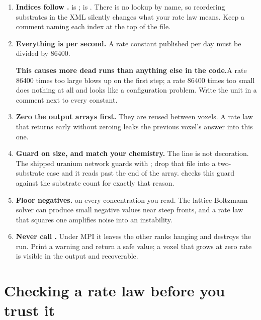 \begin{enumerate}[leftmargin=1.4em]
\item \textbf{Indices follow .}  is
;  is . There is no lookup by name, so
reordering substrates in the XML silently changes what your rate law means.
Keep a comment naming each index at the top of the file.

\item \textbf{Everything is per second.} A rate constant published per day must
be divided by 86400.

\begin{cbwarn}
\textbf{\color{cbRed}This causes more dead runs than anything else in the
code.}\quad A rate 86400 times too large blows up on the first step; a rate
86400 times too small does nothing at all and looks like a configuration
problem. Write the unit in a comment next to every constant.
\end{cbwarn}

\item \textbf{Zero the output arrays first.} They are reused between voxels. A
rate law that returns early without zeroing leaks the previous voxel's answer
into this one.

\item \textbf{Guard on size, and match your chemistry.} The
 line is not decoration. The shipped uranium network
guards with ; drop that file into a two-substrate case and
it reads past the end of the array.  checks this
guard against the substrate count for exactly that reason.

\item \textbf{Floor negatives.}  on every concentration
you read. The lattice-Boltzmann solver can produce small negative values near
steep fronts, and a rate law that squares one amplifies noise into an
instability.

\item \textbf{Never call .} Under MPI it leaves the other ranks
hanging and destroys the run. Print a warning and return a safe value; a voxel
that grows at zero rate is visible in the output and recoverable.
\end{enumerate}

\section{Checking a rate law before you trust it}

